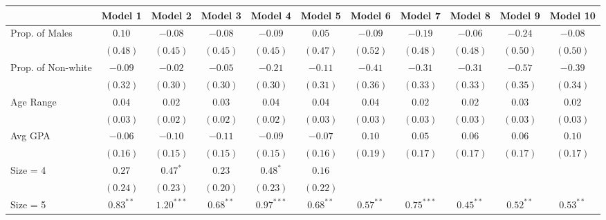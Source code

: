 \documentclass[
]{article}
\begin{document}
\begin{landscape}

\begin{table}
\begin{center}
\begin{tabular}{l c c c c c c c c c c }
\hline
 & Model 1 & Model 2 & Model 3 & Model 4 & Model 5 & Model 6 & Model 7 & Model 8 & Model 9 & Model 10 \\
\hline
Prop. of Males             & $0.10$      & $-0.08$      & $-0.08$     & $-0.09$      & $0.05$      & $-0.09$     & $-0.19$      & $-0.06$     & $-0.24$     & $-0.08$     \\
                           & $(0.48)$    & $(0.45)$     & $(0.45)$    & $(0.45)$     & $(0.47)$    & $(0.52)$    & $(0.48)$     & $(0.48)$    & $(0.50)$    & $(0.50)$    \\
Prop. of Non-white         & $-0.09$     & $-0.02$      & $-0.05$     & $-0.21$      & $-0.11$     & $-0.41$     & $-0.31$      & $-0.31$     & $-0.57$     & $-0.39$     \\
                           & $(0.32)$    & $(0.30)$     & $(0.30)$    & $(0.30)$     & $(0.31)$    & $(0.36)$    & $(0.33)$     & $(0.33)$    & $(0.35)$    & $(0.34)$    \\
Age Range                  & $0.04$      & $0.02$       & $0.03$      & $0.04$       & $0.04$      & $0.04$      & $0.02$       & $0.02$      & $0.03$      & $0.02$      \\
                           & $(0.03)$    & $(0.02)$     & $(0.02)$    & $(0.02)$     & $(0.03)$    & $(0.03)$    & $(0.03)$     & $(0.03)$    & $(0.03)$    & $(0.03)$    \\
Avg GPA                    & $-0.06$     & $-0.10$      & $-0.11$     & $-0.09$      & $-0.07$     & $0.10$      & $0.05$       & $0.06$      & $0.06$      & $0.10$      \\
                           & $(0.16)$    & $(0.15)$     & $(0.15)$    & $(0.15)$     & $(0.16)$    & $(0.19)$    & $(0.17)$     & $(0.17)$    & $(0.17)$    & $(0.17)$    \\
Size = 4                   & $0.27$      & $0.47^{*}$   & $0.23$      & $0.48^{*}$   & $0.16$      &             &              &             &             &             \\
                           & $(0.24)$    & $(0.23)$     & $(0.20)$    & $(0.23)$     & $(0.22)$    &             &              &             &             &             \\
Size = 5                   & $0.83^{**}$ & $1.20^{***}$ & $0.68^{**}$ & $0.97^{***}$ & $0.68^{**}$ & $0.57^{**}$ & $0.75^{***}$ & $0.45^{**}$ & $0.52^{**}$ & $0.53^{**}$ \\

\end{tabular}
\end{center}
\end{table}
\end{landscape}
\end{document}
